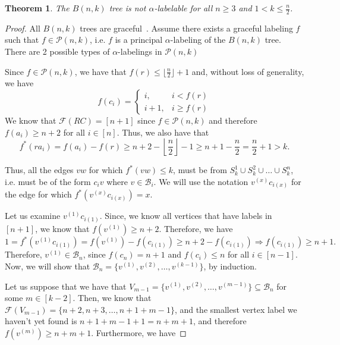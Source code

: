 \documentclass[10pt]{article}
\newtheorem{theorem}{Theorem}
\theoremstyle{definition}
\begin{document}
\begin{theorem}
  The $B(n, k)$ tree is not $\alpha$-labelable for all $n \geq 3$ and $1 < k \le \frac{n}{2}$.
\end{theorem}

\begin{proof}
  All $B(n, k)$ trees are graceful~\cite{SJ09, SJ09b}. Assume there exists a graceful labeling $f$ such that $f \in \mathcal{P}(n, k)$, i.e. $f$ is a principal $\alpha$-labeling of the $B(n, k)$ tree. There are 2 possible types of $\alpha$-labelings in $\mathcal{P}(n, k)$

  Since $f \in \mathcal{P}(n, k)$, we have that $f(r) \le \lfloor{\frac{n}{2}}\rfloor + 1$ and, without loss of generality, we have
  $$
  f(c_i) =
  \begin{cases}
    i, & i < f(r) \\
    i + 1, & i \ge f(r)
  \end{cases}
  $$
  We know that $\mathcal{F}(RC) = [n + 1]$ since $f \in \mathcal{P}(n, k)$ and therefore $f(a_i) \ge n + 2$ for all $i \in [n]$. Thus, we also have that $$f^*(ra_i) = f(a_i) - f(r) \ge n + 2 - \left\lfloor \frac{n}{2} \right\rfloor - 1 \ge n + 1 - \frac{n}{2} = \frac{n}{2} + 1 > k.$$

  Thus, all the edges $vw$ for which $f^*(vw) \le k$, must be from $S_k^1 \cup S_k^2 \cup \dots \cup S_k^n$, i.e. must be of the form $c_i v$ where $v \in \mathcal{B}_i$. We will use the notation $v^{(x)} c_{i(x)}$ for the edge for which $f^*(v^{(x)} c_{i(x)}) = x$.

  Let us examine $v^{(1)} c_{i(1)}$. Since, we know all vertices that have labels in $[n + 1]$, we know that $f(v^{(1)}) \ge n + 2$. Therefore, we have
  \begin{equation*}
    1 = f^*(v^{(1)} c_{i(1)}) = f(v^{(1)}) - f(c_{i(1)}) \ge n + 2 - f(c_{i(1)}) \Rightarrow f(c_{i(1)}) \ge n + 1.
  \end{equation*}
  Therefore, $v^{(1)} \in \mathcal{B}_n$, since $f(c_n) = n + 1$ and $f(c_i) \le n$ for all $i \in [n-1]$. Now, we will show that $\mathcal{B}_n = \{v^{(1)}, v^{(2)}, \dots, v^{(k-1)}\}$, by induction.

  Let us suppose that we have that $V_{m-1} = \{v^{(1)}, v^{(2)}, \dots, v^{(m-1)}\} \subseteq \mathcal{B}_n$ for some $m \in [k - 2]$. Then, we know that $\mathcal{F}(V_{m-1}) = \{n + 2, n + 3, \dots, n + 1 + m - 1\}$, and the smallest vertex label we haven't yet found is $n + 1 + m - 1 + 1 = n + m + 1$, and therefore $f(v^{(m)}) \ge n + m + 1$. Furthermore, we have


\end{proof}
\end{document}
